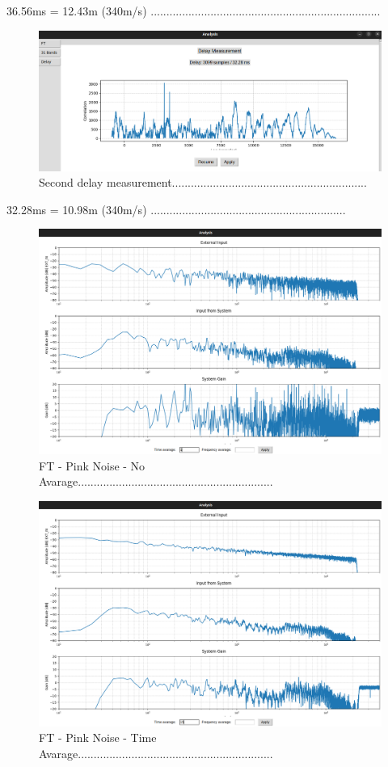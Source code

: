 36.56ms = 12.43m (340m/s) .........................................................................

\begin{figure}[H]
	\centering
	\includegraphics[width=0.6
	\linewidth]{Figures/Coro_delay_2.png}
	\caption{Second delay measurement..............................................................}
	\label{fig:Coro_delay2}
\end{figure}

32.28ms = 10.98m (340m/s) ..............................................................

\begin{figure}[H]
	\centering
	\includegraphics[width=0.6
	\linewidth]{Figures/Coro_FT_NO_av.png}
	\caption{FT - Pink Noise - No Avarage..............................................................}
	\label{fig:Coro_FT_no_av}
\end{figure}

\begin{figure}[H]
	\centering
	\includegraphics[width=0.6
	\linewidth]{Figures/Coro_FT_time_av.png}
	\caption{FT - Pink Noise - Time Avarage..............................................................}
	\label{fig:Coro_FT_time_av}
\end{figure}

